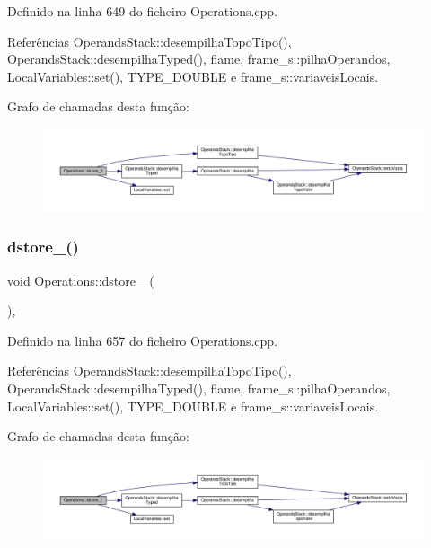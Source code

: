 Definido na linha 649 do ficheiro Operations.\+cpp.



Referências Operands\+Stack\+::desempilha\+Topo\+Tipo(), Operands\+Stack\+::desempilha\+Typed(), flame, frame\+\_\+s\+::pilha\+Operandos, Local\+Variables\+::set(), T\+Y\+P\+E\+\_\+\+D\+O\+U\+B\+LE e frame\+\_\+s\+::variaveis\+Locais.

Grafo de chamadas desta função\+:
\nopagebreak
\begin{figure}[H]
\begin{center}
\leavevmode
\includegraphics[width=350pt]{classOperations_a54dd25692395f6671a3a8e21c73eef6d_cgraph}
\end{center}
\end{figure}
\mbox{\label{classOperations_a5f12c99fca34f123522a6c1461782e5f}} 
\subsubsection{\texorpdfstring{dstore\+\_()}{dstore\_1()}}
{\footnotesize\ttfamily void Operations\+::dstore\+\_ (\begin{DoxyParamCaption}{ }\end{DoxyParamCaption})\hspace{0.3cm}{\ttfamily [static]}, {\ttfamily [private]}}



Definido na linha 657 do ficheiro Operations.\+cpp.



Referências Operands\+Stack\+::desempilha\+Topo\+Tipo(), Operands\+Stack\+::desempilha\+Typed(), flame, frame\+\_\+s\+::pilha\+Operandos, Local\+Variables\+::set(), T\+Y\+P\+E\+\_\+\+D\+O\+U\+B\+LE e frame\+\_\+s\+::variaveis\+Locais.

Grafo de chamadas desta função\+:
\nopagebreak
\begin{figure}[H]
\begin{center}
\leavevmode
\includegraphics[width=350pt]{classOperations_a5f12c99fca34f123522a6c1461782e5f_cgraph}
\end{center}
\end{figure}
\mbox{\label{classOperations_ad0f97963e6eb2482f5032fdb3465ec94}} 
